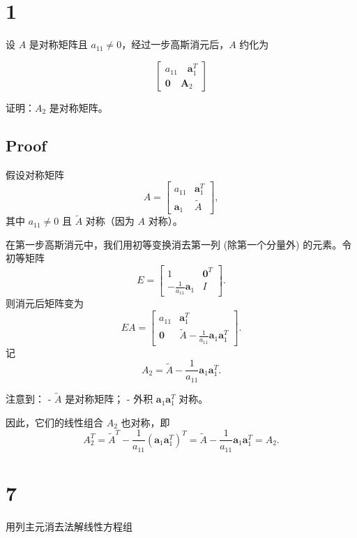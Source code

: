 \documentclass[11pt]{article}
\begin{document}
    \section{1}\label{section}

设 \(A\) 是对称矩阵且 \(a_{11}\not=0\)，经过一步高斯消元后，\(A\) 约化为

\[
\begin{bmatrix}
a_{11} \quad \boldsymbol{a}_1^T \\
\boldsymbol{0} \quad \boldsymbol{A}_2
\end{bmatrix}
\]

证明：\(A_2\) 是对称矩阵。

    \subsection{Proof}\label{proof}

假设对称矩阵 \[
A = \begin{bmatrix}
a_{11} & \boldsymbol{a}_1^T \\
\boldsymbol{a}_1 & \tilde{A}
\end{bmatrix},
\] 其中 \(a_{11}\neq 0\) 且 \(\tilde{A}\) 对称（因为 \(A\) 对称）。

在第一步高斯消元中，我们用初等变换消去第一列 (除第一个分量外)
的元素。令初等矩阵 \[
E = \begin{bmatrix}
1 & \boldsymbol{0}^T \\
-\frac{1}{a_{11}}\boldsymbol{a}_1 & I
\end{bmatrix}.
\] 则消元后矩阵变为 \[
EA = 
\begin{bmatrix}
a_{11} & \boldsymbol{a}_1^T \\
\boldsymbol{0} & \tilde{A} - \frac{1}{a_{11}}\boldsymbol{a}_1 \boldsymbol{a}_1^T
\end{bmatrix}.
\] 记 \[
A_2 = \tilde{A} - \frac{1}{a_{11}}\boldsymbol{a}_1 \boldsymbol{a}_1^T.
\]

注意到： - \(\tilde{A}\) 是对称矩阵； - 外积
\(\boldsymbol{a}_1 \boldsymbol{a}_1^T\) 对称。

因此，它们的线性组合 \(A_2\) 也对称，即 \[
A_2^T = \tilde{A}^T - \frac{1}{a_{11}}(\boldsymbol{a}_1 \boldsymbol{a}_1^T)^T = \tilde{A} - \frac{1}{a_{11}} \boldsymbol{a}_1 \boldsymbol{a}_1^T = A_2.
\]

    \section{7}\label{section}

用列主元消去法解线性方程组
\end{document}
